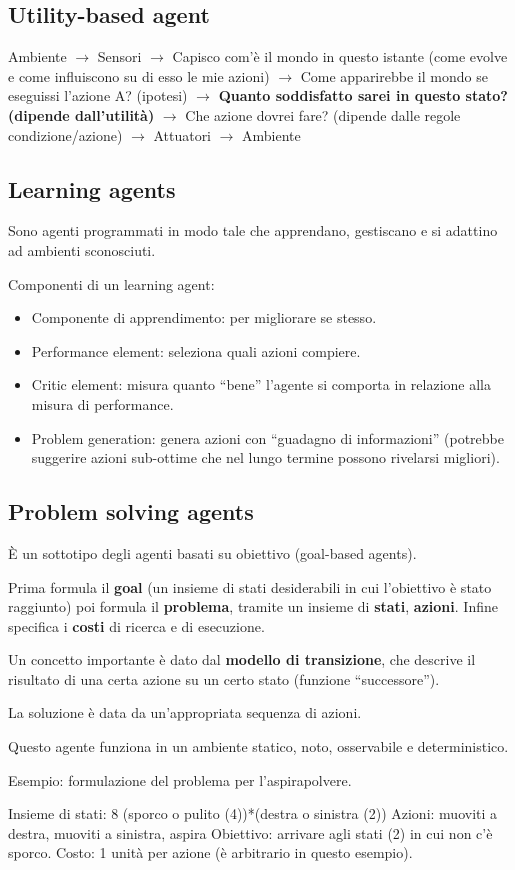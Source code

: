 \subsection{Utility-based agent}

Ambiente $\rightarrow$ Sensori $\rightarrow$ Capisco com'è il mondo in questo istante (come evolve e come influiscono su di esso le mie azioni) $\rightarrow$ Come apparirebbe il mondo se eseguissi l'azione A? (ipotesi) $\rightarrow$ \textbf{Quanto soddisfatto sarei in questo stato? (dipende dall'utilità)} $\rightarrow$ Che azione dovrei fare? (dipende dalle regole condizione/azione) $\rightarrow$ Attuatori $\rightarrow$ Ambiente

\subsection{Learning agents}

Sono agenti programmati in modo tale che apprendano, gestiscano e si adattino
ad ambienti sconosciuti.

Componenti di un learning agent:

\begin{itemize}
 \item Componente di apprendimento: per migliorare se stesso.
 \item Performance element: seleziona quali azioni compiere.
 \item Critic element: misura quanto ``bene'' l'agente si comporta in relazione
alla misura di performance.
 \item Problem generation: genera azioni con ``guadagno di informazioni''
(potrebbe suggerire azioni sub-ottime che nel lungo termine possono rivelarsi
migliori).
\end{itemize}

\subsection{Problem solving agents}

È un sottotipo degli agenti basati su obiettivo (goal-based agents).

Prima formula il \textbf{goal} (un insieme di stati desiderabili in cui
l'obiettivo è stato raggiunto) poi formula il \textbf{problema}, tramite un insieme di \textbf{stati},
\textbf{azioni}.
Infine specifica i \textbf{costi} di ricerca e di esecuzione.

Un concetto importante è dato dal \textbf{modello di transizione}, che descrive
il risultato di una certa azione su un certo stato (funzione ``successore'').

La soluzione è data da un'appropriata sequenza di azioni.

Questo agente funziona in un ambiente statico, noto, osservabile e deterministico.

Esempio: formulazione del problema per l'aspirapolvere.

Insieme di stati: 8 (sporco o pulito (4))*(destra o sinistra (2))
Azioni: muoviti a destra, muoviti a sinistra, aspira
Obiettivo: arrivare agli stati (2) in cui non c'è sporco.
Costo: 1 unità per azione (è arbitrario in questo esempio).






